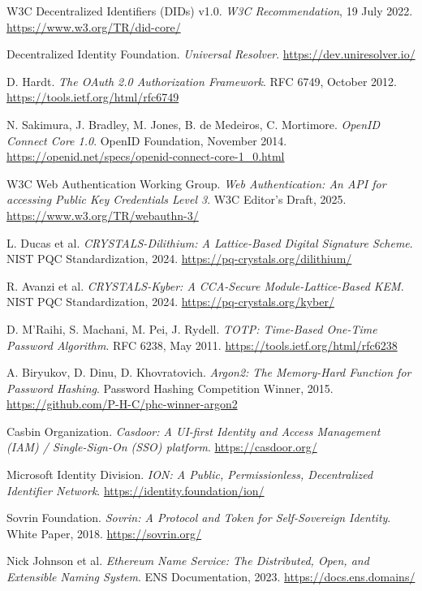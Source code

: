 \documentclass[11pt,a4paper]{article}
\begin{document}
\begin{thebibliography}{99}

W3C Decentralized Identifiers (DIDs) v1.0.
\textit{W3C Recommendation}, 19 July 2022.
\url{https://www.w3.org/TR/did-core/}

Decentralized Identity Foundation.
\textit{Universal Resolver}.
\url{https://dev.uniresolver.io/}

D. Hardt.
\textit{The OAuth 2.0 Authorization Framework}.
RFC 6749, October 2012.
\url{https://tools.ietf.org/html/rfc6749}

N. Sakimura, J. Bradley, M. Jones, B. de Medeiros, C. Mortimore.
\textit{OpenID Connect Core 1.0}.
OpenID Foundation, November 2014.
\url{https://openid.net/specs/openid-connect-core-1_0.html}

W3C Web Authentication Working Group.
\textit{Web Authentication: An API for accessing Public Key Credentials Level 3}.
W3C Editor's Draft, 2025.
\url{https://www.w3.org/TR/webauthn-3/}

L. Ducas et al.
\textit{CRYSTALS-Dilithium: A Lattice-Based Digital Signature Scheme}.
NIST PQC Standardization, 2024.
\url{https://pq-crystals.org/dilithium/}

R. Avanzi et al.
\textit{CRYSTALS-Kyber: A CCA-Secure Module-Lattice-Based KEM}.
NIST PQC Standardization, 2024.
\url{https://pq-crystals.org/kyber/}

D. M'Raihi, S. Machani, M. Pei, J. Rydell.
\textit{TOTP: Time-Based One-Time Password Algorithm}.
RFC 6238, May 2011.
\url{https://tools.ietf.org/html/rfc6238}

A. Biryukov, D. Dinu, D. Khovratovich.
\textit{Argon2: The Memory-Hard Function for Password Hashing}.
Password Hashing Competition Winner, 2015.
\url{https://github.com/P-H-C/phc-winner-argon2}

Casbin Organization.
\textit{Casdoor: A UI-first Identity and Access Management (IAM) / Single-Sign-On (SSO) platform}.
\url{https://casdoor.org/}

Microsoft Identity Division.
\textit{ION: A Public, Permissionless, Decentralized Identifier Network}.
\url{https://identity.foundation/ion/}

Sovrin Foundation.
\textit{Sovrin: A Protocol and Token for Self-Sovereign Identity}.
White Paper, 2018.
\url{https://sovrin.org/}

Nick Johnson et al.
\textit{Ethereum Name Service: The Distributed, Open, and Extensible Naming System}.
ENS Documentation, 2023.
\url{https://docs.ens.domains/}

\end{thebibliography}
\end{document}
